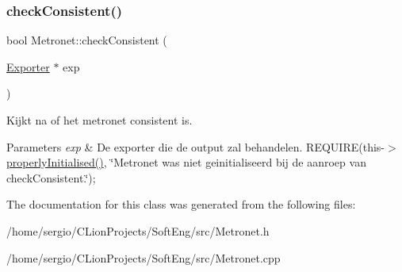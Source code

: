 \subsubsection{\texorpdfstring{check\+Consistent()}{checkConsistent()}}
{\footnotesize\ttfamily bool Metronet\+::check\+Consistent (\begin{DoxyParamCaption}\item[{\hyperlink{class_exporter}{Exporter} $\ast$}]{exp }\end{DoxyParamCaption})}



Kijkt na of het metronet consistent is. 


\begin{DoxyParams}{Parameters}
{\em exp} & De exporter die de output zal behandelen. R\+E\+Q\+U\+I\+RE(this-\/$>$\hyperlink{class_metronet_a3d2adce29a947f162924279b766de645}{properly\+Initialised()}, \char`\"{}\+Metronet was niet geinitialiseerd bij de aanroep van check\+Consistent.\char`\"{});~\newline
\\
\hline
\end{DoxyParams}


The documentation for this class was generated from the following files\+:\begin{DoxyCompactItemize}
\item 
/home/sergio/\+C\+Lion\+Projects/\+Soft\+Eng/src/Metronet.\+h\item 
/home/sergio/\+C\+Lion\+Projects/\+Soft\+Eng/src/Metronet.\+cpp\end{DoxyCompactItemize}
